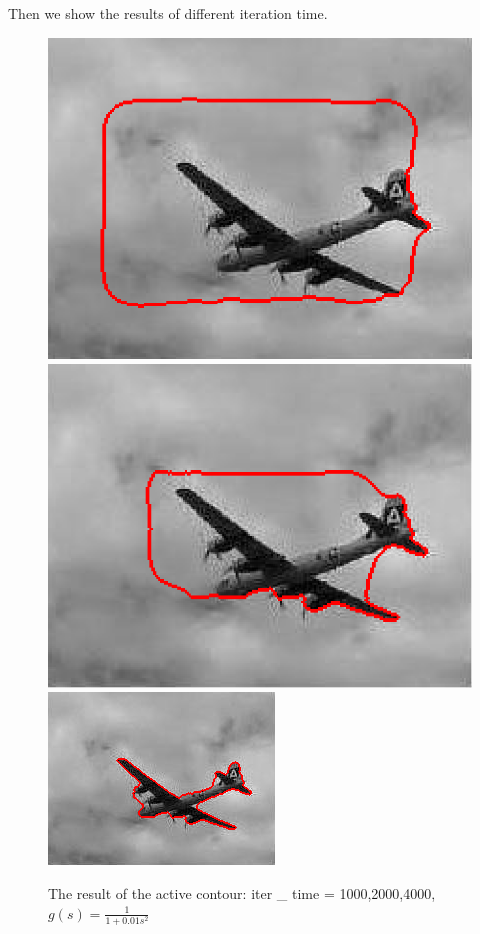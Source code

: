 \documentclass{article}
\begin{document}
Then we show the results of different iteration time.
\begin{figure}[H]
\caption{The result of the active contour: iter \_ time = 1000,2000,4000, $g(s) =\frac{1}{1+0.01s^2}$}
\begin{center}
\includegraphics[scale=.28]{iter1000.png}
\includegraphics[scale=.27]{iter2000.png}
\includegraphics[scale=.81]{iter4000.png}
\end{center}
\end{figure}
\end{document}
